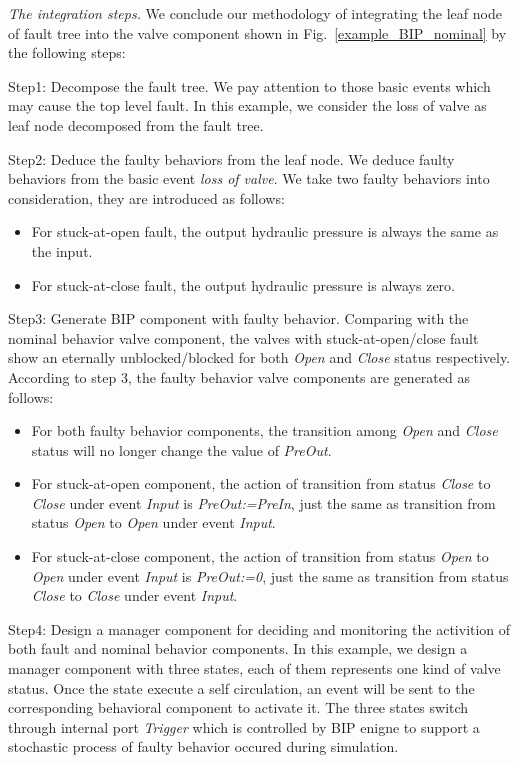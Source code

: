 \emph{The integration steps.} We conclude our methodology of integrating the leaf node of fault tree into the valve component shown in Fig.~\ref{example_BIP_nominal} by the following steps:

Step1: Decompose the fault tree. We pay attention to those basic events which may cause the top level fault. In this example, we consider the loss of valve as leaf node decomposed from the fault tree.

Step2: Deduce the faulty behaviors from the leaf node. 
We deduce faulty behaviors from the basic event \emph{loss of valve}. We take two faulty behaviors into consideration, they are introduced as follows:

\begin{itemize}
	\item For stuck-at-open fault, the output hydraulic pressure is always the same as the input.
	\item For stuck-at-close fault, the output hydraulic pressure is always zero.
\end{itemize}

Step3: Generate BIP component with faulty behavior. Comparing with the nominal behavior valve component, the valves with stuck-at-open/close fault show an eternally unblocked/blocked for both \emph{Open} and \emph{Close} status respectively. According to step 3, the faulty behavior valve components are generated as follows:

\begin{itemize}
	\item For both faulty behavior components, the transition among \emph{Open} and \emph{Close} status will no longer change the value of \emph{PreOut}.
	\item For stuck-at-open component, the action of transition from status \emph{Close} to \emph{Close} under event \emph{Input} is \emph{PreOut:=PreIn}, just the same as transition from status \emph{Open} to \emph{Open} under event \emph{Input}.
	\item For stuck-at-close component, the action of transition from status \emph{Open} to \emph{Open} under event \emph{Input} is \emph{PreOut:=0}, just the same as transition from status \emph{Close} to \emph{Close} under event \emph{Input}.
\end{itemize}

Step4: Design a manager component for deciding and monitoring the activition of both fault and nominal behavior components. In this example, we design a manager component with three states, each of them represents one kind of valve status. Once the state execute a self circulation, an event will be sent to the corresponding behavioral component to activate it. The three states switch through internal port \emph{Trigger} which is controlled by BIP enigne to support a stochastic process of faulty behavior occured during simulation.

